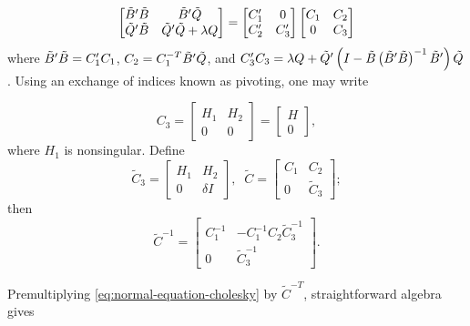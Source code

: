 \begin{equation} \label{eq:normal-equation-cholesky}
\begin{bmatrix}
\tilde{B}'\tilde{B} & \tilde{B}'\tilde{Q} \\
\tilde{Q}'\tilde{B} & \tilde{Q}'\tilde{Q} + \lambda Q\\
\end{bmatrix}
= \begin{bmatrix}
C'_1 & 0 \\
C'_2  & C'_3 
\end{bmatrix}
\begin{bmatrix}
C_1 & C_2 \\
0  & C_3 
\end{bmatrix}
\end{equation}
\noindent
where $\tilde{B}'\tilde{B} = C'_1 C_1$, $C_2 = C_1^{-T} \tilde{B}' \tilde{Q}$, and $C'_3 C_3 = \lambda Q +  \tilde{Q}'\left( I - \tilde{B}\left( \tilde{B}' \tilde{B} \right)^{-1} \tilde{B}' \right)\tilde{Q}$. Using an exchange of indices known as pivoting, one may write 

\begin{equation*}
C_3 = \begin{bmatrix} H_1 & H_2 \\ 0 & 0 \end{bmatrix} = \begin{bmatrix} H \\  0 \end{bmatrix},
\end{equation*}
\noindent
where $H_1$ is nonsingular. Define
\begin{equation} \label{eq:cholesky-factor-mod}
\tilde{C}_3 = \begin{bmatrix}
H_1 & H_2 \\
0  & \delta I 
\end{bmatrix}, \;\;
\tilde{C} = \begin{bmatrix}
C_1 & C_2 \\
0  & \tilde{C}_3 
\end{bmatrix};
\end{equation}
\noindent
then
\begin{equation} \label{eq:cholesky-factor-mod-inverse}
\tilde{C}^{-1} = \begin{bmatrix}
C_1^{-1} & -C_1^{-1} C_2 \tilde{C}_3^{-1} \\
0  & \tilde{C}_3^{-1}
\end{bmatrix}.
\end{equation}

Premultiplying \ref{eq:normal-equation-cholesky} by $\tilde{C}^{-T}$, straightforward algebra gives 

